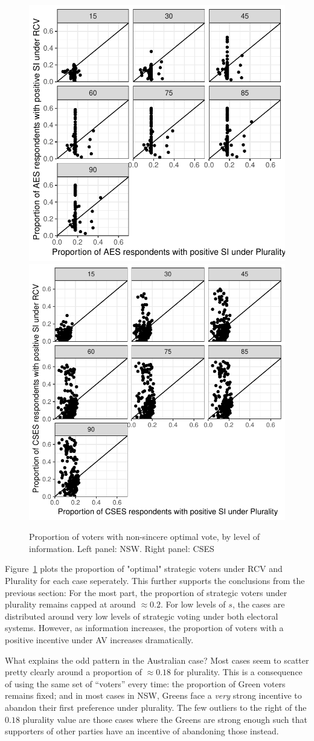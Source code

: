 \documentclass[11pt, letter, margin = 2 in]{article}
\begin{document}
\begin{figure}[!h]
	\centering
	\includegraphics[width = .45 \textwidth]{"../output/figures/australia_sv_prop"}
	\includegraphics[width = .45 \textwidth]{"../output/figures/cses_prop"}
	\caption{Proportion of voters with non-sincere optimal vote, by level of information. Left panel: NSW. Right panel: CSES}
	\label{fig:sv_dist}
\end{figure}

Figure~\ref{fig:sv_dist} plots the proportion of "optimal" strategic voters under RCV and Plurality for each case seperately. This further supports the conclusions from the previous section: For the most part, the proportion of strategic voters under plurality remains capped at around $\approx 0.2$. For low levels of $s$, the cases are distributed around very low levels of strategic voting under both electoral systems. However, as information increases, the proportion of voters with a positive incentive under AV increases dramatically.

What explains the odd pattern in the Australian case? Most cases seem to scatter pretty clearly around a proportion of $\approx 0.18$ for plurality. This is a consequence of using the same set of ``voters'' every time: the proportion of Green voters remains fixed; and in most cases in NSW, Greens face a \textit{very} strong incentive to abandon their first preference under plurality. The few outliers to the right of the $0.18$ plurality value are those cases where the Greens are strong enough such that supporters of other parties have an incentive of abandoning those instead. 
\end{document}
